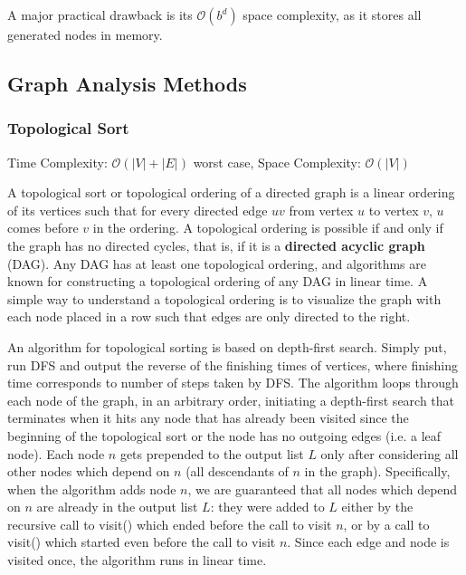 \documentclass{article}
\newcommand{\bigO}{\mathcal{O}}
\begin{document}
    A major practical drawback is its $\bigO(b^d)$ space complexity, as it stores all generated nodes in memory.
   
    
    \subsection{Graph Analysis Methods}
    \subsubsection{Topological Sort}
    Time Complexity: $\bigO(|V| + |E|)$ worst case,  Space Complexity: $\bigO(|V|)$
    
    A topological sort or topological ordering of a directed graph is a linear ordering of its vertices such that for every directed edge $uv$ from vertex $u$ to vertex $v$, $u$ comes before $v$ in the ordering. A topological ordering is possible if and only if the graph has no directed cycles, that is, if it is a \textbf{directed acyclic graph} (DAG). Any DAG has at least one topological ordering, and algorithms are known for constructing a topological ordering of any DAG in linear time. A simple way to understand a topological ordering is to visualize the graph with each node placed in a row such that edges are only directed to the right.
    
    An algorithm for topological sorting is based on depth-first search. Simply put, run DFS and output the reverse of the finishing times of vertices, where finishing time corresponds to number of steps taken by DFS. The algorithm loops through each node of the graph, in an arbitrary order, initiating a depth-first search that terminates when it hits any node that has already been visited since the beginning of the topological sort or the node has no outgoing edges (i.e. a leaf node). Each node $n$ gets prepended to the output list $L$ only after considering all other nodes which depend on $n$ (all descendants of $n$ in the graph). Specifically, when the algorithm adds node $n$, we are guaranteed that all nodes which depend on $n$ are already in the output list $L$: they were added to $L$ either by the recursive call to visit() which ended before the call to visit $n$, or by a call to visit() which started even before the call to visit $n$. Since each edge and node is visited once, the algorithm runs in linear time.
\end{document}
